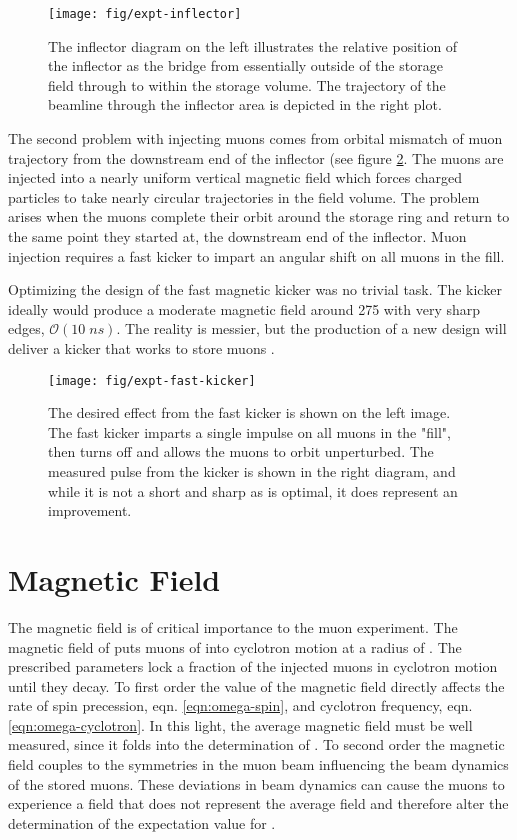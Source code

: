 \begin{figure}
\label{fig:expt-inflector}
\texttt{[image: fig/expt-inflector]}
\caption{The inflector diagram on the left illustrates the relative position of the inflector as the bridge from essentially outside of the storage field through to within the storage volume.  The trajectory of the beamline through the inflector area is depicted in the right plot.}
\end{figure}

The second problem with injecting muons comes from orbital mismatch of muon trajectory from the downstream end of the inflector (see figure \ref{fig:expt-fast-kicker}.  The muons are injected into a nearly uniform vertical magnetic field which forces charged particles to take nearly circular trajectories in the field volume.  The problem arises when the muons complete their orbit around the storage ring and return to the same point they started at, the downstream end of the inflector.  Muon injection requires a fast kicker to impart an angular shift on all muons in the fill.

Optimizing the design of the \gmtwo fast magnetic kicker was no trivial task.  The kicker ideally would produce a moderate magnetic field around \SI{275}{\gauss} with very sharp edges, $\mathcal{O}(10\;ns)$. The reality is messier, but the production of a new design will deliver a kicker that works to store muons \cite{e989-tdr}.  

\begin{figure}
\label{fig:expt-fast-kicker}
\texttt{[image: fig/expt-fast-kicker]}
\caption{The desired effect from the fast kicker is shown on the left image.  The fast kicker imparts a single impulse on all muons in the "fill", then turns off and allows the muons to orbit unperturbed.  The measured pulse from the kicker is shown in the right diagram, and while it is not a short and sharp as is optimal, it does represent an improvement.}
\end{figure}

\section{Magnetic Field}

The magnetic field is of critical importance to the muon \gmtwo experiment.  The magnetic field of \bmagic puts muons of \pmagic into cyclotron motion at a radius of \rmagic.  The prescribed parameters lock a fraction of the injected muons in cyclotron motion until they decay.  To first order the value of the magnetic field directly affects the rate of spin precession, eqn. \ref{eqn:omega-spin}, and cyclotron frequency, eqn. \ref{eqn:omega-cyclotron}.  In this light, the average magnetic field must be well measured, since it folds into the determination of \wa.  To second order the magnetic field couples to the symmetries in the muon beam influencing the beam dynamics of the stored muons.  These deviations in beam dynamics can cause the muons to experience a field that does not represent the average field and therefore alter the determination of the expectation value for \wa.

